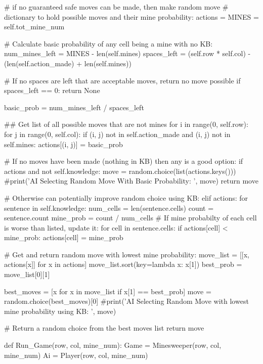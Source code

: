 \documentclass{article} %
\begin{document}
\begin{code}
        # if no guaranteed safe moves can be made, then make random move
        # dictionary to hold possible moves and their mine probability:
        actions = {}
        MINES = self.tot_mine_num

        # Calculate basic probability of any cell being a mine with no KB:
        num_mines_left = MINES - len(self.mines)
        spaces_left = (self.row * self.col) - (len(self.action_made) + len(self.mines))

        # If no spaces are left that are acceptable moves, return no move possible
        if spaces_left == 0:
            return None

        basic_prob = num_mines_left / spaces_left

        ## Get list of all possible moves that are not mines
        for i in range(0, self.row):
            for j in range(0, self.col):
                if (i, j) not in self.action_made and (i, j) not in self.mines:
                    actions[(i, j)] = basic_prob

        # If no moves have been made (nothing in KB) then any is a good option:
        if actions and not self.knowledge:
            move = random.choice(list(actions.keys()))
            #print('AI Selecting Random Move With Basic Probability: ', move)
            return move

        # Otherwise can potentially improve random choice using KB:
        elif actions:
            for sentence in self.knowledge:
                num_cells = len(sentence.cells)
                count = sentence.count
                mine_prob = count / num_cells
                # If mine probabilty of each cell is worse than listed, update it:
                for cell in sentence.cells:
                    if actions[cell] < mine_prob:
                        actions[cell] = mine_prob

            # Get and return random move with lowest mine probability:
            move_list = [[x, actions[x]] for x in actions]
            move_list.sort(key=lambda x: x[1])
            best_prob = move_list[0][1]

            best_moves = [x for x in move_list if x[1] == best_prob]
            move = random.choice(best_moves)[0]
            #print('AI Selecting Random Move with lowest mine probability using KB: ', move)

            # Return a random choice from the best moves list
            return move
        
def Run_Game(row, col, mine_num):
    Game = Minesweeper(row, col, mine_num)
    Ai = Player(row, col, mine_num)


\end{code}
\end{document}
